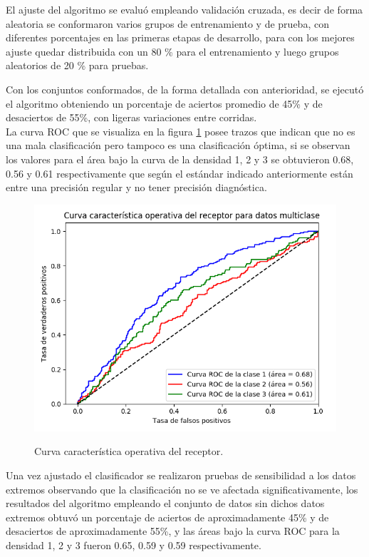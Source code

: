 El ajuste del algoritmo se evaluó empleando validación cruzada, es decir de forma aleatoria se conformaron varios grupos de entrenamiento y de prueba, con diferentes porcentajes en las primeras etapas de desarrollo, para con los mejores ajuste quedar distribuida con un 80 \% para el entrenamiento y luego grupos aleatorios de 20 \% para pruebas.

Con los conjuntos conformados, de la forma detallada con anterioridad, se ejecutó el algoritmo obteniendo  un porcentaje de aciertos promedio de  45\% y de desaciertos de 55\%, con ligeras variaciones entre corridas.\\

La curva ROC que se visualiza en la figura \ref{fig:roc} posee trazos que indican que no es una mala clasificación pero tampoco es una clasificación óptima, si se observan los valores para el área bajo la curva de la densidad 1, 2 y 3
se obtuvieron 0.68, 0.56 y 0.61 respectivamente que según el estándar indicado anteriormente
están entre una precisión regular y no tener precisión diagnóstica.\\

\begin{figure}[h!]
	\caption{Curva característica operativa del receptor.}
	\centering
	\includegraphics[scale=0.6]{roc.png}
	\label{fig:roc}
\end{figure}

Una vez ajustado el clasificador se realizaron pruebas de sensibilidad a los datos extremos observando que la clasificación no se ve afectada significativamente, los resultados del algoritmo empleando el conjunto de datos sin dichos datos extremos obtuvó un porcentaje de aciertos de aproximadamente 45\% y de desaciertos de aproximadamente 55\%, y las áreas bajo la curva ROC para la densidad 1, 2 y 3 fueron 0.65, 0.59 y 0.59 respectivamente.\\

